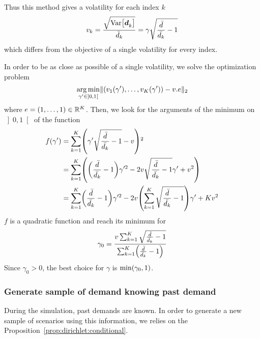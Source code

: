Thus this method gives a volatility for each index $k$
\begin{equation}
  v_k
  = \frac{\sqrt{\vari\sqbracket{\va\demand_k}}}{\bar{\demand}_k}
  = \gamma\sqrt{\frac{\bar{\demand}}{\bar{\demand_k}}-1}
\end{equation}
which differs from the objective of a single volatility for every index.

In order to be as close as possible of a single volatility, we solve the optimization problem
\begin{equation}\label{eq:dirichlet:optimization}
  \argmin_{\gamma'\in\left]0,1\right[} \norm{\bracket{v_1\bracket{\gamma'},\ldots,v_K\bracket{\gamma'}} - v.e}_2
\end{equation}
where $e=\bracket{1,\ldots,1}\in\RR^K$. Then, we look for the arguments of the minimum on $\left]0,1\right[$ of the function
\begin{subequations}
\begin{align}
  f\bracket{\gamma'}
  &= \sum_{k=1}^K \bracket{\gamma'\sqrt{\frac{\bar{\demand}}{\bar{\demand_k}}-1}-v}^2
  \\
  &= \sum_{k=1}^K
  \bracket{
  \bracket{\frac{\bar{\demand}}{\bar{\demand_k}}-1}\gamma'^2
  - 2v\sqrt{\frac{\bar{\demand}}{\bar{\demand_k}}-1}\gamma'
  + v^2
  }
  \\
  &= \sum_{k=1}^K\bracket{\frac{\bar{\demand}}{\bar{\demand_k}}-1}\gamma'^2
  - 2v\bracket{\sum_{k=1}^K\sqrt{\frac{\bar{\demand}}{\bar{\demand_k}}-1}}\gamma'
  + K v^2
\end{align}
\end{subequations}
$f$ is a quadratic function and reach its minimum for
\begin{equation}
  \gamma_0
  =
  \frac
  {v\sum_{k=1}^K\sqrt{\frac{\bar{\demand}}{\bar{\demand_k}}-1}}
  {\sum_{k=1}^K\bracket{\frac{\bar{\demand}}{\bar{\demand_k}}-1}}
\end{equation}
Since $\gamma_0>0$, the best choice for $\gamma$ is $\min\bracket{\gamma_0,1}$.




\subsubsection{Generate sample of demand knowing past demand}


During the simulation, past demands are known. In order to generate a new sample of scenarios using this information, we relies on the Proposition~\ref{prop:dirichlet:conditional}.


